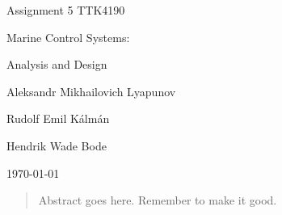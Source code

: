 \documentclass[10pt,a4paper]{memoir}
\begin{document}
\frontmatter
\begin{titlingpage}
\vspace*{\fill}
\begin{center}
\Large\textsf{Assignment 5 TTK4190}\par
\vspace{0.5em}
\huge\textsf{Marine Control Systems:}\par
\HUGE\textsf{Analysis and Design}\par
\vspace{1.2em}
\Large \textsf{Aleksandr Mikhailovich Lyapunov}\par
\Large \textsf{Rudolf Emil K{\'a}lm{\'a}n}\par
\Large \textsf{Hendrik Wade Bode}\par
\vspace{5em}
\normalsize \today
\end{center}
\vspace*{\fill}
\end{titlingpage}

\begin{abstract}
Abstract goes here. Remember to make it good. 
\end{abstract}

\cleardoublepage

\setcounter{lofdepth}{2}%
\tableofcontents
\clearpage
\listoffigures
\clearpage
\listoftables




\mainmatter%
\renewcommand{\chaptername}{Assignment}%













\backmatter
\end{document}
